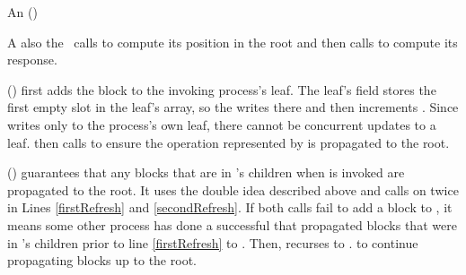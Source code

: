 An () 

A  also 
 the \dequeue\ calls  to compute
its position in the root 
 and then calls  to compute its response.

() first adds the block  to the invoking process's leaf.
The leaf's  field stores the first empty slot in the leaf's  array,
so the  writes  there  and then increments  .
Since  writes only to the process's own leaf, there cannot be concurrent updates to a leaf.
 then calls   to ensure the operation represented by  is propagated to the root.

() guarantees that any blocks that are in 's children when  is invoked are propagated to the root.
It uses the double  idea described
above and calls   on  twice in Lines
\ref{firstRefresh} and \ref{secondRefresh}. 
If both calls fail to add a block to , it means some other process has done a successful 
that propagated blocks that were in 's children prior to line \ref{firstRefresh} to .
Then,  recurses to . to continue propagating blocks up to the root.  

